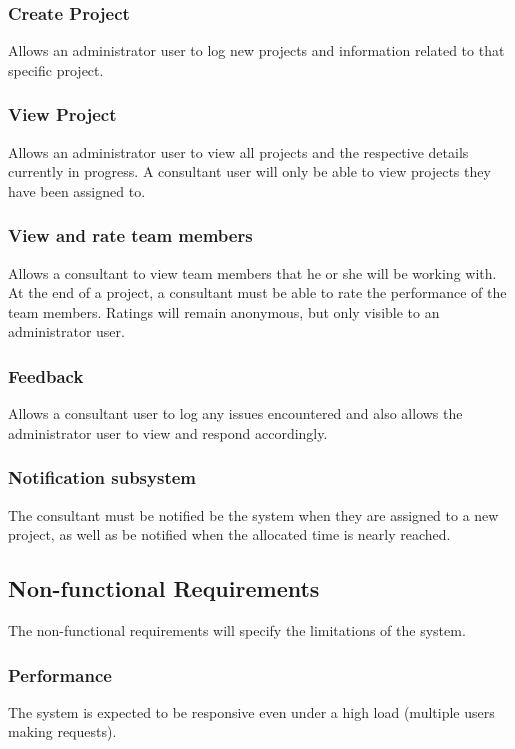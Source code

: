 \documentclass[a4paper, 12pt, oneside]{article}
\begin{document}
\subsubsection{Create Project}
Allows an administrator user to log new projects and information related to that specific project.

\subsubsection{View Project}
Allows an administrator user to view all projects and the respective details currently in progress. A consultant user will only be able to view projects they have been assigned to.

\subsubsection{View and rate team members}
Allows a  consultant to view team members that he or she will be working with. At the end of a project, a consultant must be able to rate the performance of the team members. Ratings will remain anonymous, but only visible to an administrator user.

\subsubsection{Feedback}
Allows a consultant user to log any issues encountered and also allows the administrator user to view and respond accordingly.

\subsubsection{Notification subsystem}
The consultant must be notified be the system when they are assigned to a new project, as well as be notified when the allocated time is nearly reached.

\subsection{Non-functional Requirements}
The non-functional requirements will specify the limitations of the system. 

\subsubsection{Performance}
The system is expected to be responsive even under a high load (multiple users making requests).
\end{document}
